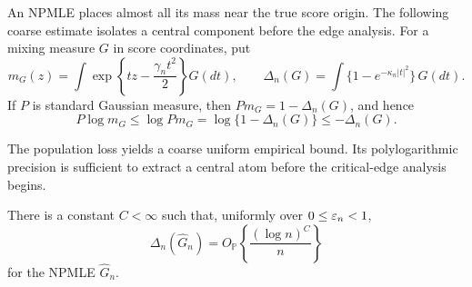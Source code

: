 An NPMLE places almost all its mass near the true score origin. The following
coarse estimate isolates a central component before the edge analysis. For a
mixing measure \(G\) in score coordinates, put
\[
    m_G(z)=\int
       \exp\left\{tz-\frac{\gamma_nt^2}{2}\right\}G(dt),
    \qquad
    \Delta_n(G)=\int\{1-e^{-\kappa_n|t|^2}\}\,G(dt).
\]
If \(P\) is standard Gaussian measure, then
\(Pm_G=1-\Delta_n(G)\), and hence
\begin{equation}
\label{eq:support-population-defect}
    P\log m_G\le\log Pm_G
       =\log\{1-\Delta_n(G)\}\le-\Delta_n(G).
\end{equation}

The population loss yields a coarse uniform empirical bound. Its
polylogarithmic precision is sufficient to extract a central atom before the
critical-edge analysis begins.
\begin{lemma}
\label{lem:support-coarse-defect}
There is a constant \(C<\infty\) such that, uniformly over
\(0\le\varepsilon_n<1\),
\[
    \Delta_n(\widehat G_n)
    =O_{\mathbb P}\left\{\frac{(\log n)^C}{n}\right\}
\]
for the NPMLE \(\widehat G_n\).
\end{lemma}

